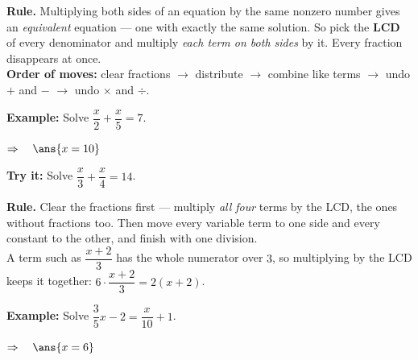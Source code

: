 \documentclass[12pt]{article}
\begin{document}


\begin{formulabox}
\textbf{Rule.} Multiplying both sides of an equation by the same nonzero
number gives an \emph{equivalent} equation --- one with exactly the same
solution. So pick the \textbf{LCD} of every denominator and multiply
\emph{each term on both sides} by it. Every fraction disappears at once.\\[3pt]
\textbf{Order of moves:} clear fractions $\rightarrow$ distribute
$\rightarrow$ combine like terms $\rightarrow$ undo $+$ and $-$ $\rightarrow$
undo $\times$ and $\div$.
\end{formulabox}

\begin{examplebox}
\textbf{Example:} \quad Solve $\dfrac{x}{2} + \dfrac{x}{5} = 7$.

$\Rightarrow\quad \ans{x = 10}$
\end{examplebox}

\begin{tryitbox}
\textbf{Try it:} \quad Solve $\dfrac{x}{3} + \dfrac{x}{4} = 14$.\\[2pt]
\end{tryitbox}


\begin{formulabox}
\textbf{Rule.} Clear the fractions first --- multiply \emph{all four} terms by
the LCD, the ones without fractions too. Then move every variable term to one
side and every constant to the other, and finish with one division.\\[3pt]
A term such as $\dfrac{x+2}{3}$ has the whole numerator over $3$, so
multiplying by the LCD keeps it together: $6 \cdot \dfrac{x+2}{3} = 2(x+2)$.
\end{formulabox}

\begin{examplebox}
\textbf{Example:} \quad Solve $\dfrac{3}{5}x - 2 = \dfrac{x}{10} + 1$.

$\Rightarrow\quad \ans{x = 6}$
\end{examplebox}
\end{document}
